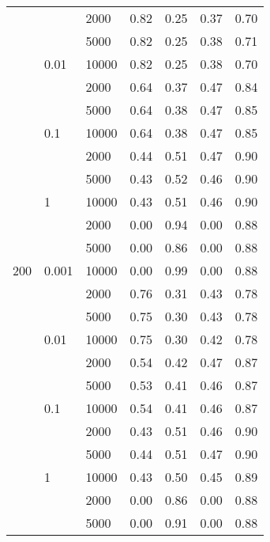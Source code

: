 \begin{tabular}{lllrrrr}
      &       & 2000 &       0.82 &       0.25 &       0.37 &       0.70 \\
      &       & 5000 &       0.82 &       0.25 &       0.38 &       0.71 \\
      & 0.01 & 10000 &       0.82 &       0.25 &       0.38 &       0.70 \\
      &       & 2000 &       0.64 &       0.37 &       0.47 &       0.84 \\
      &       & 5000 &       0.64 &       0.38 &       0.47 &       0.85 \\
      & 0.1 & 10000 &       0.64 &       0.38 &       0.47 &       0.85 \\
      &       & 2000 &       0.44 &       0.51 &       0.47 &       0.90 \\
      &       & 5000 &       0.43 &       0.52 &       0.46 &       0.90 \\
      & 1 & 10000 &       0.43 &       0.51 &       0.46 &       0.90 \\
      &       & 2000 &       0.00 &       0.94 &       0.00 &       0.88 \\
      &       & 5000 &       0.00 &       0.86 &       0.00 &       0.88 \\
200 & 0.001 & 10000 &       0.00 &       0.99 &       0.00 &       0.88 \\
      &       & 2000 &       0.76 &       0.31 &       0.43 &       0.78 \\
      &       & 5000 &       0.75 &       0.30 &       0.43 &       0.78 \\
      & 0.01 & 10000 &       0.75 &       0.30 &       0.42 &       0.78 \\
      &       & 2000 &       0.54 &       0.42 &       0.47 &       0.87 \\
      &       & 5000 &       0.53 &       0.41 &       0.46 &       0.87 \\
      & 0.1 & 10000 &       0.54 &       0.41 &       0.46 &       0.87 \\
      &       & 2000 &       0.43 &       0.51 &       0.46 &       0.90 \\
      &       & 5000 &       0.44 &       0.51 &       0.47 &       0.90 \\
      & 1 & 10000 &       0.43 &       0.50 &       0.45 &       0.89 \\
      &       & 2000 &       0.00 &       0.86 &       0.00 &       0.88 \\
      &       & 5000 &       0.00 &       0.91 &       0.00 &       0.88 \\

\end{tabular}
